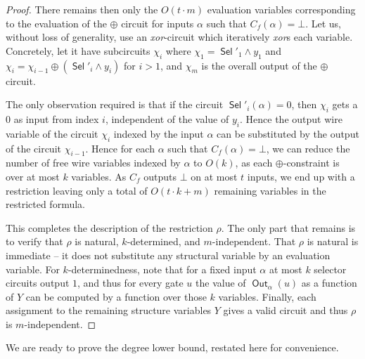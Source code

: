 \documentclass[10pt,a4paper]{article}
\theoremstyle{plain}
\theoremstyle{remark}
\theoremstyle{definition}
\DeclareMathOperator{\sel}{\mathsf{Sel}}
\newcommand{\vars}[1]{\mathsf{#1}}
\DeclareMathOperator{\outwire}{\vars{Out}}
\begin{document}
\begin{proof}
  There remains then only the $O(t \cdot m)$ evaluation variables
  corresponding to the evaluation of the $\oplus$ circuit for inputs
  $\alpha$ such that $C_f(\alpha) = \bot$. Let us, without loss of
  generality, use an \emph{xor}-circuit which iteratively \emph{xor}s
  each variable.  Concretely, let it have subcircuits $\chi_i$ where
  $\chi_1 = \sel'_1 \wedge y_1$ and
  $\chi_{i} = \chi_{i-1} \oplus (\sel'_i \wedge y_i)$ for $i > 1$, and
  $\chi_m$ is the overall output of the $\oplus$ circuit.

  The only observation required is that if the circuit
  $\sel'_i(\alpha) = 0$, then $\chi_i$ gets a $0$ as input from index
  $i$, independent of the value of $y_i$. Hence the output wire
  variable of the circuit $\chi_i$ indexed by the input $\alpha$ can
  be substituted by the output of the circuit $\chi_{i-1}$. Hence for
  each $\alpha$ such that $C_f(\alpha) = \bot$, we can reduce the
  number of free wire variables indexed by $\alpha$ to $O(k)$, as each
  $\oplus$-constraint is over at most $k$ variables.  As $C_f$ outputs
  $\bot$ on at most $t$ inputs, we end up with a restriction leaving
  only a total of $O(t \cdot k + m)$ remaining variables in the
  restricted formula.

  This completes the description of the restriction $\rho$.  The only
  part that remains is to verify that $\rho$ is natural,
  $k$-determined, and $m$-independent.  That $\rho$ is natural is
  immediate -- it does not substitute any structural variable by an
  evaluation variable.  For $k$-determinedness, note that for a fixed
  input $\alpha$ at most $k$ selector circuits output $1$, and thus
  for every gate $u$ the value of $\outwire_\alpha(u)$ as a function
  of $Y$ can be computed by a function over those $k$ variables.
  Finally, each assignment to the remaining structure variables $Y$
  gives a valid circuit and thus $\rho$ is $m$-independent.
\end{proof}

We are ready to prove the degree lower bound, restated here for
convenience.

\MainDegree*
\end{document}
